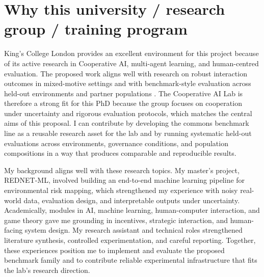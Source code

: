 \documentclass[10pt]{article}
\begin{document}
\section{Why this university / research group / training program}

King's College London provides an excellent environment for this project because of its active research in Cooperative AI, multi-agent learning, and human-centred evaluation. The proposed work aligns well with research on robust interaction outcomes in mixed-motive settings and with benchmark-style evaluation across held-out environments and partner populations \citep{meltingpot2021, socialjax2025}. The Cooperative AI Lab is therefore a strong fit for this PhD because the group focuses on cooperation under uncertainty and rigorous evaluation protocols, which matches the central aims of this proposal. I can contribute by developing the commons benchmark line as a reusable research asset for the lab and by running systematic held-out evaluations across environments, governance conditions, and population compositions in a way that produces comparable and reproducible results.

My background aligns well with these research topics. My master's project, REDNET-ML, involved building an end-to-end machine learning pipeline for environmental risk mapping, which strengthened my experience with noisy real-world data, evaluation design, and interpretable outputs under uncertainty. Academically, modules in AI, machine learning, human-computer interaction, and game theory gave me grounding in incentives, strategic interaction, and human-facing system design. My research assistant and technical roles strengthened literature synthesis, controlled experimentation, and careful reporting. Together, these experiences position me to implement and evaluate the proposed benchmark family and to contribute reliable experimental infrastructure that fits the lab's research direction.
\end{document}
